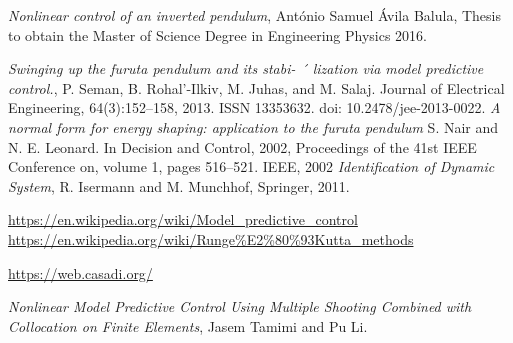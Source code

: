 \documentclass[a4paper,11pt]{article}
\theoremstyle{definition} \newtheorem{deff}{Definicija}[section]
\theoremstyle{definition} \newtheorem{prim}[deff]{Primer}
\theoremstyle{plain} \newtheorem{teor}[deff]{Teorema}
\begin{document}
	\begin{thebibliography}{9}
		\emph{Nonlinear control of an inverted pendulum}, António Samuel Ávila Balula, Thesis to obtain the Master of Science Degree in
		Engineering Physics 2016.
		
		\emph{Swinging up the furuta pendulum and its stabi- ´
			lization via model predictive control.}, P. Seman, B. Rohal’-Ilkiv, M. Juhas, and M. Salaj.  Journal of Electrical Engineering, 64(3):152–158, 2013. ISSN
		13353632. doi: 10.2478/jee-2013-0022.
		\emph{A normal form for energy shaping: application to the furuta pendulum}
		S. Nair and N. E. Leonard. 
		In Decision and Control, 2002, Proceedings of the 41st IEEE Conference on, volume 1, pages
		516–521. IEEE, 2002
		\emph{Identification of Dynamic System}, R. Isermann and M. Munchhof, Springer, 2011.
		
		\url{https://en.wikipedia.org/wiki/Model_predictive_control}
		\url{https://en.wikipedia.org/wiki/Runge%E2%80%93Kutta_methods}
		
		\url{https://web.casadi.org/}
		
		\emph{Nonlinear Model Predictive Control Using Multiple Shooting Combined with 
		Collocation on Finite Elements}, Jasem Tamimi and Pu Li.
		
	\end{thebibliography}
\end{document}
